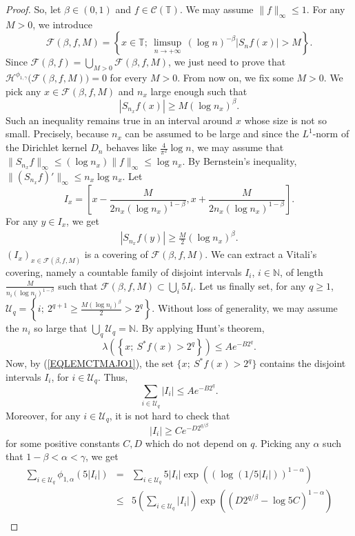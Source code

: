 \documentclass[11pt,a4paper]{amsart}
\theoremstyle{plain}
\begin{document}
\begin{proof}
So, let $\beta\in(0,1)$ and $f\in\mathcal C({\mathbb T})$. We may assume $\|f\|_\infty\leq 1$. For any $M>0$,
we introduce
$$\mathcal F(\beta,f,M)=\left\{x\in{\mathbb T};\ \limsup_{n\to +\infty} \,(\log n)^{-\beta}|S_n f(x)|> M\right\}.$$
Since $\mathcal F(\beta,f)=\bigcup_{M>0} \mathcal F(\beta,f,M)$, we just need to prove that
$\mathcal H^{\phi_{1,\gamma}}\big(\mathcal F(\beta,f,M)\big)=0$ for every $M>0$.
 From now on, we fix some $M>0$.
We pick any $x\in\mathcal F(\beta,f,M)$ and $n_x$ large enough such that 
$$|S_{n_x}f(x)|\geq M(\log n_x)^\beta.$$
Such an inequality remains true in an interval around $x$ whose size is not so small. Precisely, 
because $n_x$ can be assumed to be large and since the $L^1$-norm of the
Dirichlet kernel $D_n$  
behaves like $\frac{4}{\pi^2}\log n$, we may assume that
$\|S_{n_x}f\|_\infty\leq (\log n_x)\|f\|_{\infty}\le \log n_x$.
By Bernstein's inequality, $\|(S_{n_x}f)'\|_\infty\leq n_x \log n_x$. Let
$$I_x=\left[x-\frac{M}{2n_x(\log n_x)^{1-\beta}},x+\frac{M}{2n_x(\log
    n_x)^{1-\beta}}\right].$$ 
For any $y\in I_x$, we get 
\begin{eqnarray}\label{EQLEMCTMAJO1}
|S_{n_x}f(y)|\geq \frac M2(\log n_x)^\beta.
\end{eqnarray}
$(I_x)_{x\in\mathcal F(\beta,f,M)}$ is a covering of $\mathcal F(\beta,f,M)$. 
We can extract a Vitali's covering, namely a countable family of disjoint intervals $I_i$, $i\in\mathbb N$,
of length $\frac M{n_i(\log n_i)^{1-\beta}}$ such that $\mathcal F(\beta,f,M)\subset \bigcup_{i}5I_i$.
Let us finally set, for any $q\geq 1$, $\mathcal U_q=\left\{i;\ 2^{q+1}\geq \frac{M(\log n_i)^\beta}{2}>2^q\right\}$.
Without loss of generality, we may assume the $n_i$ so large that $\bigcup_q \mathcal U_q=\mathbb N$. By applying Hunt's theorem,
$$\mathcal \lambda\left(\left\{x;\ S^* f(x)>2^q\right\}\right)\leq Ae^{-B2^q}.$$
Now, by (\ref{EQLEMCTMAJO1}), the set $\{x;\ S^* f(x)>2^q\}$ contains the disjoint intervals $I_i$, for $i\in\mathcal U_q$.
Thus,
$$\sum_{i\in\mathcal U_q} |I_i|\leq Ae^{-B2^q}.$$
Moreover, for any $i\in\mathcal U_q$, it is not hard to check that
$$|I_i|\geq Ce^{-D2^{q/\beta}}$$
for some positive constants $C,D$ which do not depend on $q$. Picking any
$\alpha$ such that $1-\beta<\alpha<\gamma$, 
we get 
\begin{eqnarray*}
\sum_{i\in\mathcal U_q}\mathcal \phi_{1,\alpha}(5|I_i|)
&=&\sum_{i\in\mathcal U_q} 5|I_i| \exp\left((\log (1/5|I_i|))^{1-\alpha}\right)\\
&\leq&5\left(\sum_{i\in\mathcal U_q}|I_i|\right)\exp\left(\left(D2^{q/\beta}-\log 5C\right)^{1-\alpha}\right)\\

\end{eqnarray*}
\end{proof}
\end{document}
